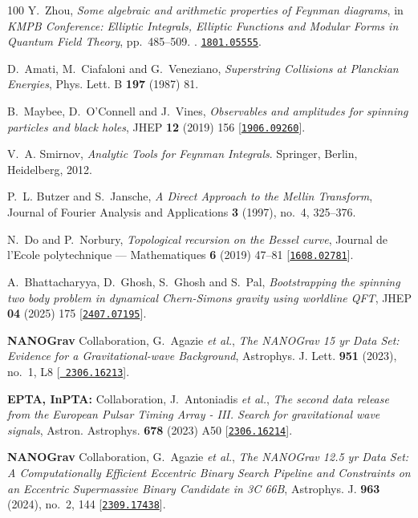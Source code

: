 \begin{thebibliography}{100}
Y.~Zhou,  {\em {Some algebraic and arithmetic properties of Feynman diagrams}},
  in {\em {KMPB Conference}: {Elliptic Integrals, Elliptic Functions and
  Modular Forms in Quantum Field Theory}}, pp.~485--509.
.
\newblock \href{http://www.arXiv.org/abs/1801.05555}{{\tt 1801.05555}}.

D.~Amati, M.~Ciafaloni and G.~Veneziano,  {\em {Superstring Collisions at
  Planckian Energies}}, Phys. Lett. B {\bf 197} (1987) 81.

B.~Maybee, D.~O'Connell and J.~Vines,  {\em {Observables and amplitudes for
  spinning particles and black holes}}, JHEP {\bf 12} (2019) 156
  [\href{http://www.arXiv.org/abs/1906.09260}{{\tt 1906.09260}}].

V.~A. Smirnov, {\em Analytic Tools for Feynman Integrals}.
\newblock Springer, Berlin, Heidelberg, 2012.

P.~L. Butzer and S.~Jansche,  {\em A Direct Approach to the Mellin Transform},
  Journal of Fourier Analysis and Applications {\bf 3} (1997), no.~4, 325--376.

N.~Do and P.~Norbury,  {\em Topological recursion on the Bessel curve}, Journal
  de l'Ecole polytechnique --- Mathematiques {\bf 6} (2019) 47--81
  [\href{http://www.arXiv.org/abs/1608.02781}{{\tt 1608.02781}}].

A.~Bhattacharyya, D.~Ghosh, S.~Ghosh and S.~Pal,  {\em {Bootstrapping the
  spinning two body problem in dynamical Chern-Simons gravity using worldline
  QFT}}, JHEP {\bf 04} (2025) 175
  [\href{http://www.arXiv.org/abs/2407.07195}{{\tt 2407.07195}}].

{\bf NANOGrav} Collaboration, G.~Agazie {\em et al.},  {\em {The NANOGrav 15 yr
  Data Set: Evidence for a Gravitational-wave Background}}, Astrophys. J. Lett.
  {\bf 951} (2023), no.~1, L8 [\href{http://www.arXiv.org/abs/2306.16213}{{\tt
  2306.16213}}].

{\bf EPTA, InPTA:} Collaboration, J.~Antoniadis {\em et al.},  {\em {The second
  data release from the European Pulsar Timing Array - III. Search for
  gravitational wave signals}}, Astron. Astrophys. {\bf 678} (2023) A50
  [\href{http://www.arXiv.org/abs/2306.16214}{{\tt 2306.16214}}].

{\bf NANOGrav} Collaboration, G.~Agazie {\em et al.},  {\em {The NANOGrav 12.5
  yr Data Set: A Computationally Efficient Eccentric Binary Search Pipeline and
  Constraints on an Eccentric Supermassive Binary Candidate in 3C 66B}},
  Astrophys. J. {\bf 963} (2024), no.~2, 144
  [\href{http://www.arXiv.org/abs/2309.17438}{{\tt 2309.17438}}].


\end{thebibliography}
